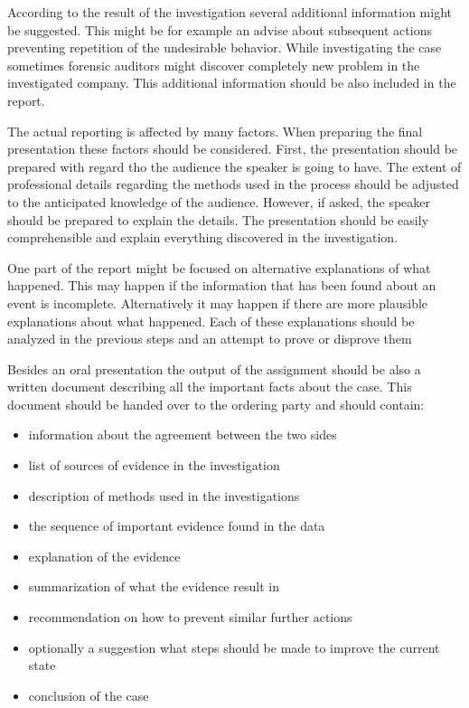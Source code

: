 According to the result of the investigation several additional information might be suggested. This might be for example an advise about subsequent actions preventing repetition of the undesirable behavior. While investigating the case sometimes forensic auditors might discover completely new problem in the investigated company. This additional information should be also included in the report. 

The actual reporting is affected by many factors. When preparing the final presentation these factors should be considered. First, the presentation should be prepared with regard tho the audience the speaker is going to have. The extent of professional details regarding the methods used in the process should be adjusted to the anticipated knowledge of the audience. However, if asked, the speaker should be prepared to explain the details. The presentation should be easily comprehensible and explain everything discovered in the investigation. 

One part of the report might be focused on alternative explanations of what happened. This may happen if the information that has been found about an event is incomplete. Alternatively it may happen if there are more plausible explanations about what happened. Each of these explanations should be analyzed in the previous steps and an attempt to prove or disprove them


Besides an oral presentation the output of the assignment should be also a written document describing all the important facts about the case. This document should be handed over to the ordering party and should contain:
\begin{itemize}
\item information about the agreement between the two sides
\item list of sources of evidence in the investigation
\item description of methods used in the investigations
\item the sequence of important evidence found in the data 
\item explanation of the evidence
\item summarization of what the evidence result in
\item recommendation on how to prevent similar further actions
\item optionally a suggestion what steps should be made to improve the current state
\item conclusion of the case
\end {itemize}


